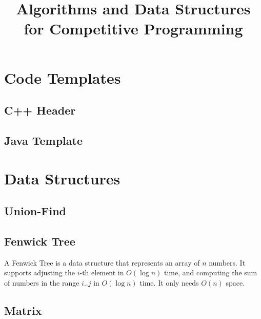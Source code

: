 \documentclass[10pt,a4paper,titlepage]{article}
\title{Algorithms and Data Structures for Competitive Programming}
\begin{document}
\maketitle
\tableofcontents
\newpage

\section{Code Templates}
\subsection{C++ Header}


\subsection{Java Template}


\section{Data Structures}

\subsection{Union-Find}



\subsection{Fenwick Tree}
A Fenwick Tree is a data structure that represents an array of $n$ numbers. It supports adjusting the $i$-th element in $O(\log n)$ time, and computing the sum of numbers in the range $i..j$ in $O(\log n)$ time. It only needs $O(n)$ space.



\subsection{Matrix}

\end{document}
